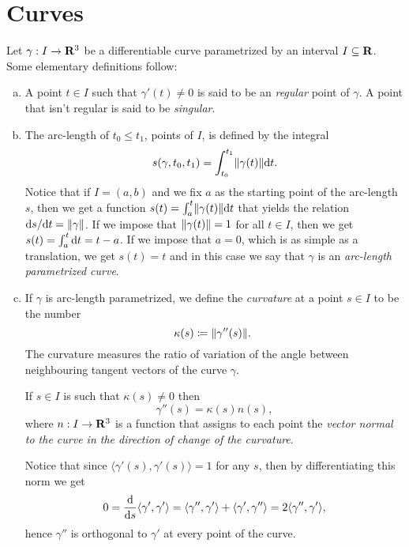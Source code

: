 \chapter{Curves}

\begin{definition}\label{def:curve-r}
    Let \(\gamma: I \to \mathbf{R}^3\) be a differentiable curve parametrized by an interval \(I \subseteq \mathbf{R}\).
    Some elementary definitions follow:
    \begin{enumerate}[(a)]\setlength\itemsep{0em}
        \item A point \(t \in I\) such that \(\gamma'(t) \neq 0\) is said to be an \emph{regular}
            point of \(\gamma\). A point that isn't regular is said to be \emph{singular}.

        \item The arc-length of \(t_0 \leq t_1\), points of \(I\), is defined by the integral
            \[
                s(\gamma, t_0, t_1) = \int_{t_0}^{t_1} \lVert\gamma(t)\rVert \mathrm{d} t.
            \]
            Notice that if \(I = (a, b)\) and we fix \(a\) as the starting point of the arc-length
            \(s\), then we get a function \(s(t) = \int_a^t \lVert\gamma(t)\rVert \mathrm{d} t\) that yields
            the relation \(\mathrm{d} s / \mathrm{d} t = \lVert\gamma\rVert\). If we impose that \(\lVert\gamma(t)\rVert
            = 1\) for all \(t \in I\), then we get \(s(t) = \int_a^t \mathrm{d} t = t - a\). If we impose
            that \(a = 0\), which is as simple as a translation, we get \(s(t) = t\) and in this
            case we say that \(\gamma\) is an \emph{arc-length parametrized curve}.

        \item If \(\gamma\) is arc-length parametrized, we define the \emph{curvature} at a point
            \(s \in I\) to be the number 
            \[
                \kappa(s) \coloneq \lVert\gamma''(s)\rVert.\
            \] 
            The curvature measures the ratio of variation of the angle between neighbouring tangent
            vectors of the curve \(\gamma\).

            If \(s \in I\) is such that \(\kappa(s) \neq 0\) then 
            \[
                \gamma''(s) = \kappa(s) n(s),
            \]
            where \(n: I \to \mathbf{R}^3\) is a function that assigns to each point the \emph{vector normal
            to the curve in the direction of change of the curvature}.

            Notice that since \(\langle \gamma'(s), \gamma'(s) \rangle = 1\) for any \(s\), then by
            differentiating this norm we get
            \begin{align}\label{eq:curve-r-velocity-acceleration-orthogonal}
                0 = \frac{\mathrm{d}}{\mathrm{d} s} \langle \gamma', \gamma' \rangle
                = \langle \gamma'', \gamma' \rangle + \langle \gamma', \gamma'' \rangle
                = 2 \langle \gamma'', \gamma' \rangle,
            \end{align}
            hence \(\gamma''\) is orthogonal to \(\gamma'\) at every point of the curve.


\end{enumerate}
\end{definition}
